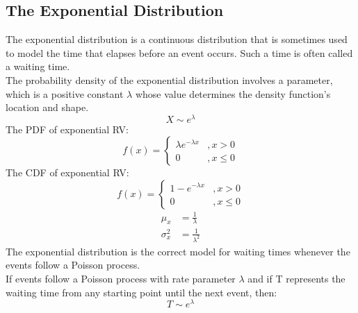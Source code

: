 \documentclass[../main.tex]{subfiles}
\begin{document}
\subsection{The Exponential Distribution}
The exponential distribution is a continuous distribution that is sometimes used to model the time that elapses before an event occurs. Such a time is often called a waiting time.\\
The probability density of the exponential distribution involves a parameter, which is a positive constant $\lambda$ whose value determines the density function's location and shape.\\
\begin{equation*}
    X\sim e^{\lambda}
\end{equation*}
The PDF of exponential RV:
\begin{equation*}
    f(x)=
    \begin{cases}
    \lambda e^{-\lambda x} &, x>0\\
    0 &, x \leq 0
    \end{cases}
\end{equation*}
The CDF of exponential RV:
\begin{equation*}
    f(x)=
    \begin{cases}
    1-e^{-\lambda x} &, x>0\\
    0 &, x \leq 0
    \end{cases}
\end{equation*}
\begin{align*}
    \mu _x &= \frac{1}{\lambda}\\
    \sigma _x ^2 &= \frac{1}{\lambda^2}
\end{align*}
The exponential distribution is the correct model for waiting times whenever the events follow a Poisson process.\\
If events follow a Poisson process with rate parameter $\lambda$ and if T represents the waiting time from any starting point until the next event, then:
\begin{equation*}
    T\sim e^{\lambda}
\end{equation*}
\end{document}
